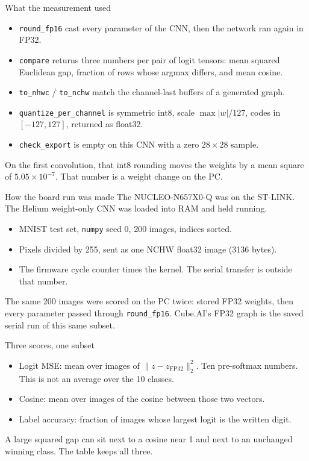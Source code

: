\documentclass[aspectratio=169,11pt]{beamer}
\begin{document}
\begin{frame}{What the measurement used}
  \begin{itemize}
    \item \texttt{round\_fp16} cast every parameter of the CNN, then the network ran again in FP32.
    \item \texttt{compare} returns three numbers per pair of logit tensors: mean squared Euclidean gap, fraction of rows whose argmax differs, and mean cosine.
    \item \texttt{to\_nhwc} / \texttt{to\_nchw} match the channel-last buffers of a generated graph.
    \item \texttt{quantize\_per\_channel} is symmetric int8, scale \(\max|w|/127\), codes in \([-127,127]\), returned as float32.
    \item \texttt{check\_export} is empty on this CNN with a zero \(28\times 28\) sample.
  \end{itemize}

  On the first convolution, that int8 rounding moves the weights by a mean square of \(5.05\times 10^{-7}\). That number is a weight change on the PC.
\end{frame}

\begin{frame}{How the board run was made}
  The NUCLEO-N657X0-Q was on the ST-LINK. The Helium weight-only CNN was loaded into RAM and held running.

  \begin{itemize}
    \item MNIST test set, \texttt{numpy} seed 0, 200 images, indices sorted.
    \item Pixels divided by 255, sent as one NCHW float32 image (3136 bytes).
    \item The firmware cycle counter times the kernel. The serial transfer is outside that number.
  \end{itemize}

  The same 200 images were scored on the PC twice: stored FP32 weights, then every parameter passed through \texttt{round\_fp16}. Cube.AI's FP32 graph is the saved serial run of this same subset.
\end{frame}

\begin{frame}{Three scores, one subset}
  \begin{itemize}
    \item Logit MSE: mean over images of \(\|z - z_{\mathrm{FP32}}\|_2^2\). Ten pre-softmax numbers. This is not an average over the 10 classes.
    \item Cosine: mean over images of the cosine between those two vectors.
    \item Label accuracy: fraction of images whose largest logit is the written digit.
  \end{itemize}

  A large squared gap can sit next to a cosine near 1 and next to an unchanged winning class. The table keeps all three.
\end{frame}
\end{document}
